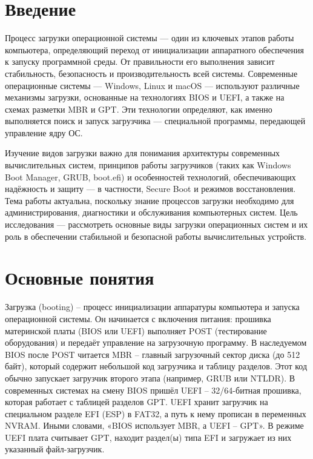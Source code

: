 \hypertarget{ux432ux432ux435ux434ux435ux43dux438ux435}{%
\chapter{Введение}\label{ux432ux432ux435ux434ux435ux43dux438ux435}}

Процесс загрузки операционной системы --- один из ключевых этапов работы
компьютера, определяющий переход от инициализации аппаратного
обеспечения к запуску программной среды. От правильности его выполнения
зависит стабильность, безопасность и производительность всей системы.
Современные операционные системы --- Windows, Linux и macOS ---
используют различные механизмы загрузки, основанные на технологиях BIOS
и UEFI, а также на схемах разметки MBR и GPT. Эти технологии определяют,
как именно выполняется поиск и запуск загрузчика --- специальной
программы, передающей управление ядру ОС.

Изучение видов загрузки важно для понимания архитектуры современных
вычислительных систем, принципов работы загрузчиков (таких как Windows
Boot Manager, GRUB, boot.efi) и особенностей технологий, обеспечивающих
надёжность и защиту --- в частности, Secure Boot и режимов
восстановления. Тема работы актуальна, поскольку знание процессов
загрузки необходимо для администрирования, диагностики и обслуживания
компьютерных систем. Цель исследования --- рассмотреть основные виды
загрузки операционных систем и их роль в обеспечении стабильной и
безопасной работы вычислительных устройств.

\hypertarget{ux43eux441ux43dux43eux432ux43dux44bux435-ux43fux43eux43dux44fux442ux438ux44f}{%
\chapter{Основные
понятия}\label{ux43eux441ux43dux43eux432ux43dux44bux435-ux43fux43eux43dux44fux442ux438ux44f}}

Загрузка (booting) -- процесс инициализации аппаратуры компьютера и
запуска операционной системы. Он начинается с включения питания:
прошивка материнской платы (BIOS или UEFI) выполняет POST (тестирование
оборудования) и передаёт управление на загрузочную программу. В
наследуемом BIOS после POST читается MBR -- главный загрузочный сектор
диска (до 512 байт), который содержит небольшой код загрузчика и таблицу
разделов. Этот код обычно запускает загрузчик второго этапа (например,
GRUB или NTLDR). В современных системах на смену BIOS пришёл UEFI --
32/64-битная прошивка, которая работает с таблицей разделов GPT. UEFI
хранит загрузчик на специальном разделе EFI (ESP) в FAT32, а путь к нему
прописан в переменных NVRAM. Иными словами, «BIOS использует MBR, а UEFI
-- GPT». В режиме UEFI плата считывает GPT, находит раздел(ы) типа EFI и
загружает из них указанный файл-загрузчик.

